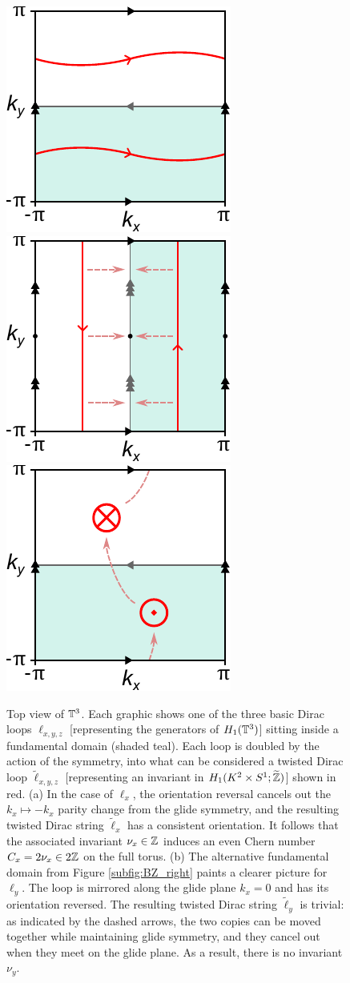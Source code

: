 \begin{figure}[htb!]
	\centering
	 {\includegraphics[width=.3\textwidth]{Images/Z_invariant}}
	\hfil
	 {\includegraphics[width=.3\textwidth]{Images/0_invariant}}
	\hfil
	 {\includegraphics[width=.3\textwidth]{Images/Z2_invariant}}
	\caption{Top view of $\mathbb{T}^3$. Each graphic shows one of the three basic Dirac loops $\ell_{x,y,z}$ [representing the generators of $H_1(\mathbb{T}^3)$] sitting inside a fundamental domain (shaded teal). Each loop is doubled by the action of the symmetry, into what can be considered a twisted Dirac loop $\tilde{\ell}_{x,y,z}$ [representing an invariant in $H_1(K^2\times S^1;\widetilde{\mathbb{Z}})$] shown in red. (a) In the case of $\ell_x$, the orientation reversal cancels out the $k_x \mapsto -k_x$ parity change from the glide symmetry, and the resulting twisted Dirac string $\tilde{\ell}_x$ has a consistent orientation. It follows that the associated invariant $\nu_x\in\mathbb{Z}$ induces an even Chern number $C_x = 2\nu_x\in 2\mathbb{Z}$ on the full torus.
		(b) The alternative fundamental domain from Figure \ref{subfig:BZ_right} paints a clearer picture for $\ell_y$. The loop is mirrored along the glide plane $k_x=0$ and has its orientation reversed. The resulting twisted Dirac string $\tilde{\ell}_y$ is trivial: as indicated by the dashed arrows, the two copies can be moved together while maintaining glide symmetry, and they cancel out when they meet on the glide plane. As a result, there is no invariant $\nu_y$.
}
\end{figure}
